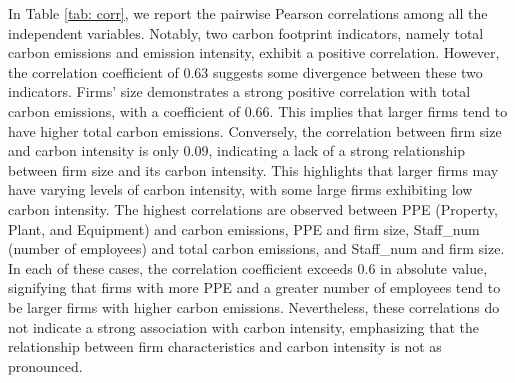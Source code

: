 \documentclass[12pt]{article}
\begin{document}
In Table \ref{tab: corr}, we report the pairwise Pearson correlations among all the independent variables. Notably, two carbon footprint indicators, namely total carbon emissions and emission intensity, exhibit a positive correlation. However, the correlation coefficient of 0.63 suggests some divergence between these two indicators. Firms' size demonstrates a strong positive correlation with total carbon emissions, with a coefficient of 0.66. This implies that larger firms tend to have higher total carbon emissions. Conversely, the correlation between firm size and carbon intensity is only 0.09, indicating a lack of a strong relationship between firm size and its carbon intensity. This highlights that larger firms may have varying levels of carbon intensity, with some large firms exhibiting low carbon intensity. The highest correlations are observed between PPE (Property, Plant, and Equipment) and carbon emissions, PPE and firm size, Staff\_num (number of employees) and total carbon emissions, and Staff\_num and firm size. In each of these cases, the correlation coefficient exceeds 0.6 in absolute value, signifying that firms with more PPE and a greater number of employees tend to be larger firms with higher carbon emissions. Nevertheless, these correlations do not indicate a strong association with carbon intensity, emphasizing that the relationship between firm characteristics and carbon intensity is not as pronounced.
\end{document}
